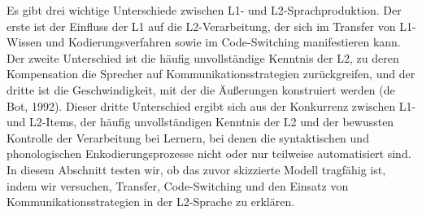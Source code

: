 \documentclass[
  letterpaper,
]{scrbook}
\begin{document}
Es gibt drei wichtige Unterschiede zwischen L1- und L2-Sprachproduktion.
Der erste ist der Einfluss der L1 auf die L2-Verarbeitung, der sich im
Transfer von L1-Wissen und Kodierungsverfahren sowie im Code-Switching
manifestieren kann. Der zweite Unterschied ist die häufig unvollständige
Kenntnis der L2, zu deren Kompensation die Sprecher auf
Kommunikationsstrategien zurückgreifen, und der dritte ist die
Geschwindigkeit, mit der die Äußerungen konstruiert werden (de Bot,
1992). Dieser dritte Unterschied ergibt sich aus der Konkurrenz zwischen
L1- und L2-Items, der häufig unvollständigen Kenntnis der L2 und der
bewussten Kontrolle der Verarbeitung bei Lernern, bei denen die
syntaktischen und phonologischen Enkodierungsprozesse nicht oder nur
teilweise automatisiert sind. In diesem Abschnitt testen wir, ob das
zuvor skizzierte Modell tragfähig ist, indem wir versuchen, Transfer,
Code-Switching und den Einsatz von Kommunikationsstrategien in der
L2-Sprache zu erklären.
\end{document}
